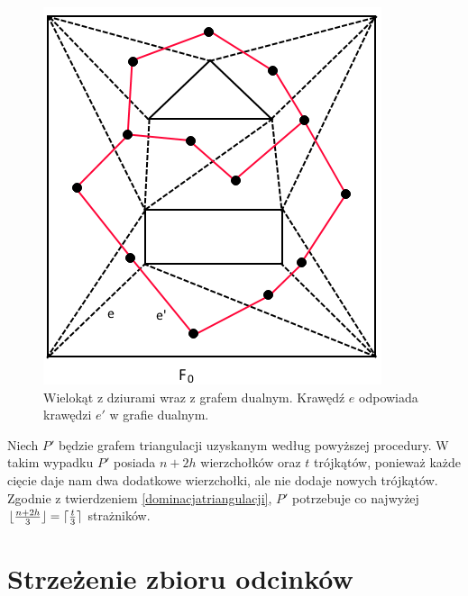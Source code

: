 \documentclass[brudnopis]{xmgr}
\DeclarePairedDelimiter\ceil{\lceil}{\rceil}
\DeclarePairedDelimiter\floor{\lfloor}{\rfloor}
\theoremstyle{definition}
\begin{document}
\begin{figure}[h!]
  \centering
    \includegraphics{rysunki/triangulacja_dziury.png}
    \caption{Wielokąt z dziurami wraz z grafem dualnym. Krawędź $e$ odpowiada krawędzi $e'$ w grafie dualnym.}
    \label{fig:triangulacja}
\end{figure} 

\indent Niech $P'$ będzie grafem triangulacji uzyskanym według powyższej procedury. W takim wypadku $P'$ posiada $n + 2h$ wierzchołków oraz $t$ trójkątów, ponieważ każde cięcie daje nam dwa dodatkowe wierzchołki, ale nie dodaje nowych trójkątów. Zgodnie z twierdzeniem \ref{dominacjatriangulacji}, $P'$ potrzebuje co najwyżej $\floor{\frac{n+2h}{3}} = \ceil{\frac{t}{3}}$ strażników.

\chapter{Strzeżenie zbioru odcinków}
\end{document}
